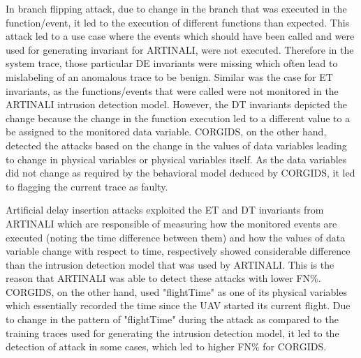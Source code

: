 In branch flipping attack, due to change in the branch that was executed in the function/event, it led to the execution of different functions than expected. This attack led to a use case where the events which should have been called and were used for generating invariant for ARTINALI, were not executed. Therefore in the system trace, those particular D\textbar E invariants were missing which often lead to mislabeling of an anomalous trace to be benign. Similar was the case for E\textbar T invariants, as the functions/events that were called were not monitored in the ARTINALI intrusion detection model. However, the D\textbar T invariants depicted the change because the change in the function execution led to a different value to a be assigned to the monitored data variable. \ac{CORGIDS}, on the other hand, detected the attacks based on the change in the values of data variables leading to change in physical variables or physical variables itself. As the data variables did not change as required by the behavioral model deduced by \ac{CORGIDS}, it led to flagging the current trace as faulty.

Artificial delay insertion attacks exploited the E\textbar T and D\textbar T invariants from ARTINALI which are responsible of measuring how the monitored events are executed (noting the time difference between them) and how the values of data variable change with respect to time, respectively showed considerable difference than the intrusion detection model that was used by ARTINALI. This is the reason that ARTINALI was able to detect these attacks with lower \ac{FN}\%. \ac{CORGIDS}, on the other hand, used "flightTime" as one of its physical variables which essentially recorded the time since the \ac{UAV} started its current flight. Due to change in the pattern of "flightTime" during the attack as compared to the training traces used for generating the intrusion detection model, it led to the detection of attack in some cases, which led to higher \ac{FN}\% for \ac{CORGIDS}.


